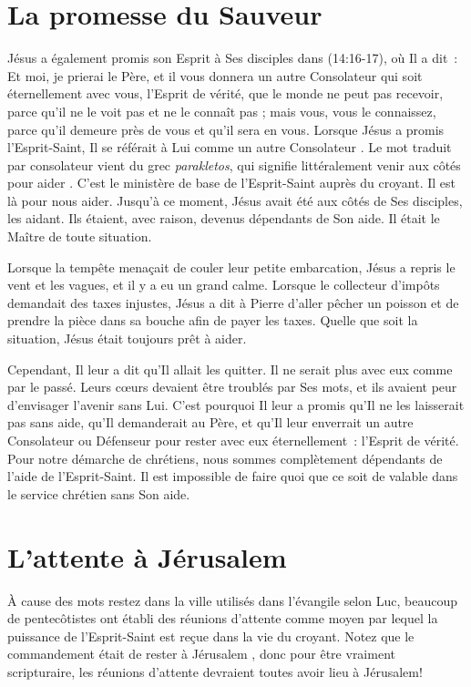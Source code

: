 \section*{La promesse du Sauveur}

Jésus a également promis son Esprit à Ses disciples dans
 (14:16-17), où Il a dit~:
 \og Et moi, je prierai le Père, et il vous donnera un autre Consolateur
 qui soit éternellement avec vous, l'Esprit de vérité, que le monde ne peut
 pas recevoir, parce qu'il ne le voit pas et ne le connaît pas ; mais vous,
 vous le connaissez, parce qu'il demeure près de vous
 et qu'il sera en vous. \fg{}
 Lorsque Jésus a promis l'Esprit-Saint, Il se référait à Lui comme
 \og un autre Consolateur \fg{}.
 Le mot traduit par consolateur vient du grec \emph{parakletos},
 qui signifie littéralement \og venir aux côtés pour aider \fg{}.
 C'est le ministère de base de l'Esprit-Saint auprès du croyant.
 Il est là pour nous aider. Jusqu'à ce moment, Jésus avait été aux côtés
 de Ses disciples, les aidant. Ils étaient, avec raison, devenus dépendants
 de Son aide. Il était le Maître de toute situation.

Lorsque la tempête menaçait de couler leur petite embarcation, Jésus
 a repris le vent et les vagues, et il y a eu un grand calme.
 Lorsque le collecteur d'impôts demandait des taxes injustes,
 Jésus a dit à Pierre d'aller pêcher un poisson et de prendre
 la pièce dans sa bouche afin de payer les taxes.
 Quelle que soit la situation, Jésus était toujours prêt à aider.

Cependant, Il leur a dit qu'Il allait les quitter.
 Il ne serait plus avec eux comme par le passé.
 Leurs cœurs devaient être troublés par Ses mots,
 et ils avaient peur d'envisager l'avenir sans Lui.
 C'est pourquoi Il leur a promis qu'Il ne les laisserait pas sans aide,
 qu'Il demanderait au Père, et qu'Il leur enverrait un autre Consolateur
 ou Défenseur pour rester avec eux éternellement~:
 l'Esprit de vérité.
 Pour notre démarche de chrétiens, nous sommes complètement dépendants de
 l'aide de l'Esprit-Saint.
 Il est impossible de faire quoi que ce soit de valable dans le service
 chrétien sans Son aide.

\section*{L'attente à Jérusalem}

À cause des mots \og restez dans la ville \fg{} utilisés dans
 l'évangile selon Luc, beaucoup de pentecôtistes ont établi des \og réunions
 d'attente \fg{} comme moyen par lequel la puissance de l'Esprit-Saint est
 reçue dans la vie du croyant. Notez que le commandement était de \og rester
 à Jérusalem \fg{} ,
 donc pour être vraiment scripturaire, les réunions d'attente devraient toutes
 avoir lieu à Jérusalem!

